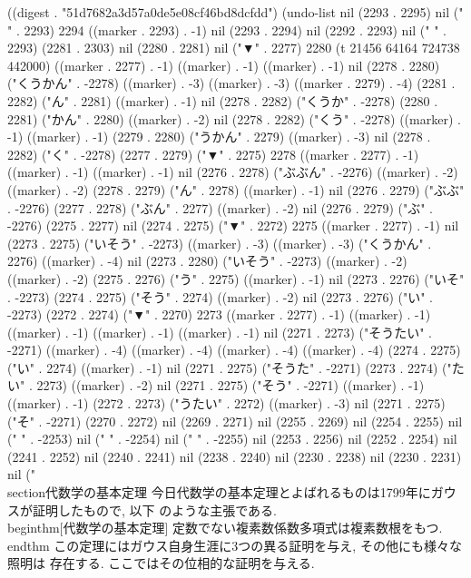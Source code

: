 
((digest . "51d7682a3d57a0de5e08cf46bd8dcfdd") (undo-list nil (2293 . 2295) nil (" " . 2293) 2294 ((marker . 2293) . -1) nil (2293 . 2294) nil (2292 . 2293) nil (" " . 2293) (2281 . 2303) nil (2280 . 2281) nil ("▼" . 2277) 2280 (t 21456 64164 724738 442000) ((marker . 2277) . -1) ((marker) . -1) ((marker) . -1) nil (2278 . 2280) ("くうかん" . -2278) ((marker) . -3) ((marker) . -3) ((marker . 2279) . -4) (2281 . 2282) ("ん" . 2281) ((marker) . -1) nil (2278 . 2282) ("くうか" . -2278) (2280 . 2281) ("かん" . 2280) ((marker) . -2) nil (2278 . 2282) ("くう" . -2278) ((marker) . -1) ((marker) . -1) (2279 . 2280) ("うかん" . 2279) ((marker) . -3) nil (2278 . 2282) ("く" . -2278) (2277 . 2279) ("▼" . 2275) 2278 ((marker . 2277) . -1) ((marker) . -1) ((marker) . -1) nil (2276 . 2278) ("ぶぶん" . -2276) ((marker) . -2) ((marker) . -2) (2278 . 2279) ("ん" . 2278) ((marker) . -1) nil (2276 . 2279) ("ぶぶ" . -2276) (2277 . 2278) ("ぶん" . 2277) ((marker) . -2) nil (2276 . 2279) ("ぶ" . -2276) (2275 . 2277) nil (2274 . 2275) ("▼" . 2272) 2275 ((marker . 2277) . -1) nil (2273 . 2275) ("いそう" . -2273) ((marker) . -3) ((marker) . -3) ("くうかん" . 2276) ((marker) . -4) nil (2273 . 2280) ("いそう" . -2273) ((marker) . -2) ((marker) . -2) (2275 . 2276) ("う" . 2275) ((marker) . -1) nil (2273 . 2276) ("いそ" . -2273) (2274 . 2275) ("そう" . 2274) ((marker) . -2) nil (2273 . 2276) ("い" . -2273) (2272 . 2274) ("▼" . 2270) 2273 ((marker . 2277) . -1) ((marker) . -1) ((marker) . -1) ((marker) . -1) ((marker) . -1) nil (2271 . 2273) ("そうたい" . -2271) ((marker) . -4) ((marker) . -4) ((marker) . -4) ((marker) . -4) (2274 . 2275) ("い" . 2274) ((marker) . -1) nil (2271 . 2275) ("そうた" . -2271) (2273 . 2274) ("たい" . 2273) ((marker) . -2) nil (2271 . 2275) ("そう" . -2271) ((marker) . -1) ((marker) . -1) (2272 . 2273) ("うたい" . 2272) ((marker) . -3) nil (2271 . 2275) ("そ" . -2271) (2270 . 2272) nil (2269 . 2271) nil (2255 . 2269) nil (2254 . 2255) nil ("
" . -2253) nil (" " . -2254) nil (" " . -2255) nil (2253 . 2256) nil (2252 . 2254) nil (2241 . 2252) nil (2240 . 2241) nil (2238 . 2240) nil (2230 . 2238) nil (2230 . 2231) nil ("\\section{代数学の基本定理}
今日代数学の基本定理とよばれるものは1799年にガウスが証明したもので, 以下
のような主張である.
\\begin{thm}[代数学の基本定理]
 定数でない複素数係数多項式は複素数根をもつ.
\\end{thm}
この定理にはガウス自身生涯に3つの異る証明を与え, その他にも様々な照明は
存在する. ここではその位相的な証明を与える.

